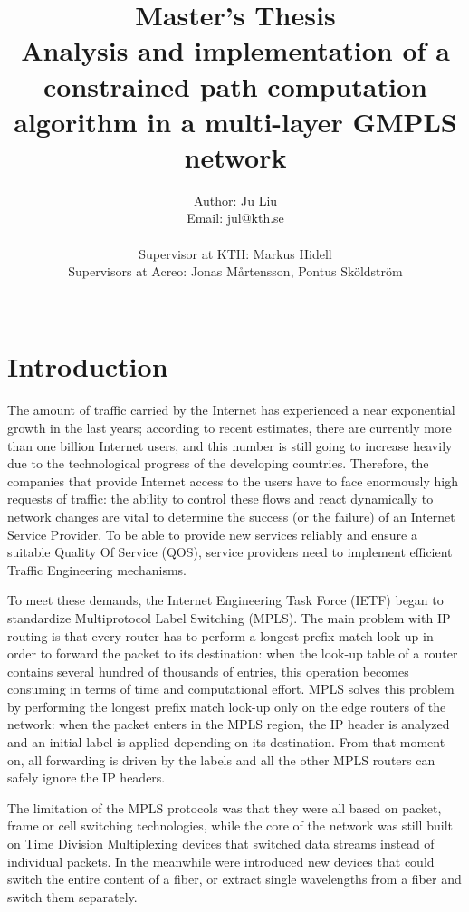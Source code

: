 \documentclass[10pt,a4paper]{report}
\author{Author: Ju Liu \\ Email: jul@kth.se \\\\
  Supervisor at KTH: Markus Hidell \\ Supervisors at Acreo: Jonas
  Mårtensson, Pontus Sköldström \\\\ }
\title{\textbf{Master's Thesis}
  \\Analysis and implementation of a constrained path
    computation algorithm in a multi-layer GMPLS network}
\begin{document}
\setlength{\parskip}{4ex}

\maketitle

\chapter{Introduction}
The amount of traffic carried by the Internet has experienced a near
exponential growth in the last years; according to recent estimates,
there are currently more than one billion Internet users, and this
number is still going to increase heavily due to the technological
progress of the developing countries. Therefore, the companies that
provide Internet access to the users have to face enormously high
requests of traffic: the ability to control these flows and react
dynamically to network changes are vital to determine the success (or
the failure) of an Internet Service Provider. To be able to provide
new services reliably and ensure a suitable Quality Of Service (QOS),
service providers need to implement efficient Traffic Engineering
mechanisms.

To meet these demands, the Internet Engineering Task Force (IETF)
began to standardize Multiprotocol Label Switching (MPLS). The main
problem with IP routing is that every router has to perform a longest
prefix match look-up in order to forward the packet to its
destination: when the look-up table of a router contains several
hundred of thousands of entries, this operation becomes consuming in
terms of time and computational effort. MPLS solves this problem by
performing the longest prefix match look-up only on the edge routers
of the network: when the packet enters in the MPLS region, the IP
header is analyzed and an initial label is applied depending on its
destination. From that moment on, all forwarding is driven by the
labels and all the other MPLS routers can safely ignore the IP
headers.

The limitation of the MPLS protocols was that they were all based on
packet, frame or cell switching technologies, while the core of the
network was still built on Time Division Multiplexing devices that
switched data streams instead of individual packets. In the meanwhile
were introduced new devices that could switch the entire content of a
fiber, or extract single wavelengths from a fiber and switch them
separately.
\end{document}
